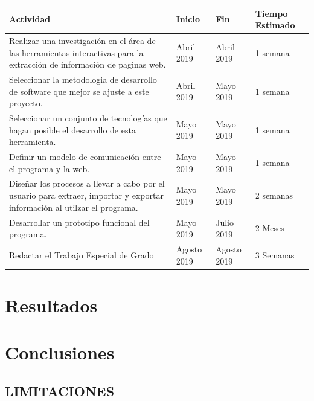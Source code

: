 \documentclass[12pt]{report}
\begin{document}
\noindent
\begin{tabularx}{1\textwidth}{ |X|l|l|l| }

\hline
Actividad & Inicio & Fin & Tiempo Estimado \\
\hline
Realizar una investigación en el área de las herramientas interactivas para la extracción de información de paginas web. & Abril 2019 & Abril 2019 & 1 semana \\
\hline
Seleccionar la metodologia de desarrollo de software que mejor se ajuste a este proyecto. & Abril 2019 & Mayo 2019 & 1 semana \\
\hline
Seleccionar un conjunto de tecnologías que hagan posible el desarrollo de esta herramienta. & Mayo 2019 & Mayo 2019 & 1 semana \\
\hline
Definir un modelo de comunicación entre el programa y la web. & Mayo 2019 & Mayo 2019 & 1 semana \\
\hline
Diseñar los procesos a llevar a cabo por el usuario para extraer, importar y exportar información al utilzar el programa. & Mayo 2019 & Mayo 2019 & 2 semanas \\
\hline
Desarrollar un prototipo funcional del programa. & Mayo 2019 & Julio 2019 & 2 Meses \\
\hline
Redactar el Trabajo Especial de Grado & Agosto 2019 & Agosto 2019 & 3 Semanas \\
\hline
  
\end{tabularx}

\break


\chapter{Resultados}




\chapter{Conclusiones}

\section[Limitaciones]{LIMITACIONES}
\end{document}
